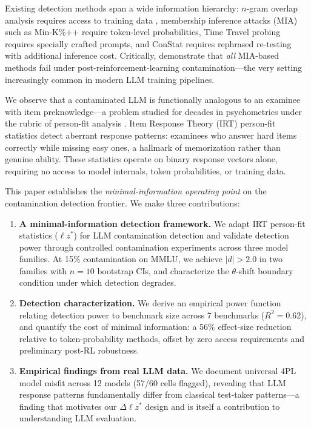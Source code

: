 \documentclass[11pt,a4paper]{article}
\begin{document}
Existing detection methods span a wide information hierarchy: $n$-gram overlap analysis requires access to training data \citep{brown2020language}, membership inference attacks (MIA) such as Min-K\%++ \citep{shi2024detecting} require token-level probabilities, Time Travel probing \citep{deng2024investigating} requires specially crafted prompts, and ConStat \citep{oren2024proving} requires rephrased re-testing with additional inference cost.
Critically, \citet{wang2025rlcontam} demonstrate that \emph{all} MIA-based methods fail under post-reinforcement-learning contamination---the very setting increasingly common in modern LLM training pipelines.

We observe that a contaminated LLM is functionally analogous to an examinee with item preknowledge---a problem studied for decades in psychometrics under the rubric of person-fit analysis \citep{meijer2001methodology}.
Item Response Theory (IRT) person-fit statistics detect aberrant response patterns: examinees who answer hard items correctly while missing easy ones, a hallmark of memorization rather than genuine ability.
These statistics operate on binary response vectors alone, requiring no access to model internals, token probabilities, or training data.

This paper establishes the \emph{minimal-information operating point} on the contamination detection frontier.
We make three contributions:

\begin{enumerate}
\item \textbf{A minimal-information detection framework.}
We adapt IRT person-fit statistics ($\ell z^*$) for LLM contamination detection and validate detection power through controlled contamination experiments across three model families.
At 15\% contamination on MMLU, we achieve $|d|{>}2.0$ in two families with $n{=}10$ bootstrap CIs, and characterize the $\theta$-shift boundary condition under which detection degrades.

\item \textbf{Detection characterization.}
We derive an empirical power function relating detection power to benchmark size across 7 benchmarks ($R^2{=}0.62$), and quantify the cost of minimal information: a 56\% effect-size reduction relative to token-probability methods, offset by zero access requirements and preliminary post-RL robustness.

\item \textbf{Empirical findings from real LLM data.}
We document universal 4PL model misfit across 12 models (57/60 cells flagged), revealing that LLM response patterns fundamentally differ from classical test-taker patterns---a finding that motivates our $\Delta \ell z^*$ design and is itself a contribution to understanding LLM evaluation.
\end{enumerate}
\end{document}
